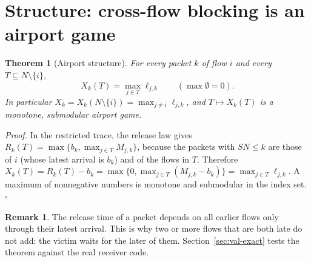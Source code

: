 \documentclass[11pt]{article}
\newtheorem{theorem}{Theorem}
\theoremstyle{definition}
\newtheorem{remark}{Remark}
\begin{document}
\section{Structure: cross-flow blocking is an airport game}
\begin{theorem}[Airport structure]\label{thm:airport}
For every packet $k$ of flow $i$ and every $T\subseteq N\setminus\{i\}$,
\[
X_k(T)=\max_{j\in T}\ell_{j,k}\qquad(\max\emptyset=0).
\]
In particular $X_k=X_k(N\setminus\{i\})=\max_{j\ne i}\ell_{j,k}$, and $T\mapsto X_k(T)$ is a monotone, submodular \emph{airport game}.
\end{theorem}
\emph{Proof.} In the restricted trace, the release law gives $R_k(T)=\max\{b_k,\max_{j\in T}M_{j,k}\}$, because the packets with $SN\le k$ are those of $i$ (whose latest arrival is $b_k$) and of the flows in $T$. Therefore $X_k(T)=R_k(T)-b_k=\max\{0,\max_{j\in T}(M_{j,k}-b_k)\}=\max_{j\in T}\ell_{j,k}$. A maximum of nonnegative numbers is monotone and submodular in the index set. \hfill$\square$

\begin{remark}
The release time of a packet depends on all earlier flows only through their latest arrival. This is why two or more flows that are both late do not add: the victim waits for the later of them. Section~\ref{sec:val-exact} tests the theorem against the real receiver code.
\end{remark}
\end{document}
